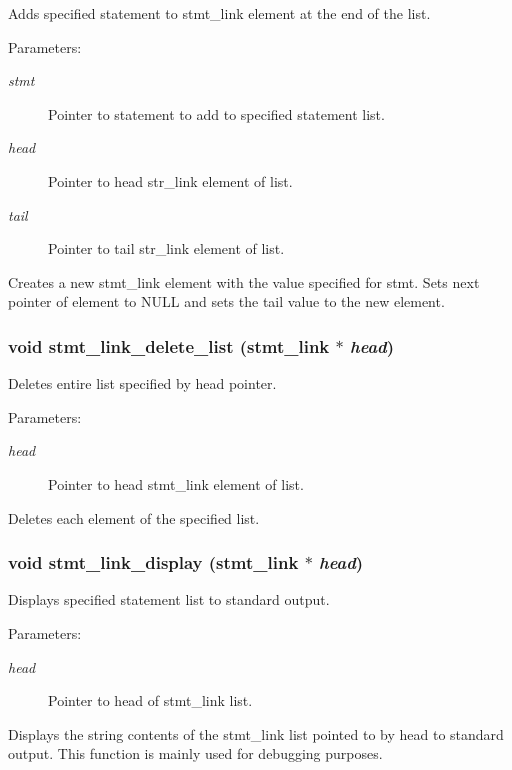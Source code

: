 Adds specified statement to stmt\_\-link element at the end of the list. 

\begin{Desc}
\item[Parameters:]
\begin{description}
\item[{\em stmt}]Pointer to statement to add to specified statement list. \item[{\em head}]Pointer to head str\_\-link element of list. \item[{\em tail}]Pointer to tail str\_\-link element of list.\end{description}
\end{Desc}
Creates a new stmt\_\-link element with the value specified for stmt. Sets next pointer of element to NULL and sets the tail value to the new element. 
\subsubsection{\setlength{\rightskip}{0pt plus 5cm}void stmt\_\-link\_\-delete\_\-list ({\bf stmt\_\-link} $\ast$ {\em head})}\label{link_8h_a19}


Deletes entire list specified by head pointer. 

\begin{Desc}
\item[Parameters:]
\begin{description}
\item[{\em head}]Pointer to head stmt\_\-link element of list.\end{description}
\end{Desc}
Deletes each element of the specified list. 
\subsubsection{\setlength{\rightskip}{0pt plus 5cm}void stmt\_\-link\_\-display ({\bf stmt\_\-link} $\ast$ {\em head})}\label{link_8h_a7}


Displays specified statement list to standard output. 

\begin{Desc}
\item[Parameters:]
\begin{description}
\item[{\em head}]Pointer to head of stmt\_\-link list.\end{description}
\end{Desc}
Displays the string contents of the stmt\_\-link list pointed to by head to standard output. This function is mainly used for debugging purposes. 
